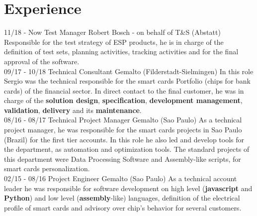 \documentclass[]{friggeri-cv}
\begin{document}

\section{Experience}
\begin{entrylist}
  \entry
    {11/18 - Now}
    {Test Manager}
    {\normalsize{Robert Bosch - on behalf of T\&S (Abstatt)}}
    {Responsible for the test strategy of ESP products, he is in charge of the definition of test sets, planning activities, tracking activities and for the final approval of the software.
    \\}
  \entry
    {09/17 - 10/18}
    {Technical Consultant}
    {\normalsize{Gemalto (Filderstadt-Sielmingen)}}
    {In this role Sergio was the technical responsible for the smart cards Portfolio (chips for bank cards) of the  financial sector. In direct contact to the final customer, he was in charge of the \textbf{solution design},\textbf{ specification},\textbf{ development management},\textbf{ validation},\textbf{ delivery} and its\textbf{ maintenance}.
     \\}
  \entry
    {08/16 - 08/17}
    {Technical Project Manager}
    {\normalsize{Gemalto (Sao Paulo)}}
    {As a technical project manager, he was responsible for the smart cards projects in Sao Paulo (Brazil) for the first tier accounts. In this role he also led and develop tools for the department, as automation and optimization tools. The standard projects of this department were Data Processing Software and Assembly-like scripts, for smart cards personalization. 
    \\}
    \entry
    {02/15 - 08/16}
    {Project Engineer}
    {\normalsize{Gemalto (Sao Paulo)}}
    {As a technical account leader he was responsible for software development on high level (\textbf{javascript} and \textbf{Python}) and low level (\textbf{assembly}-like) languages, definition of the electrical profile of smart cards and advisory over chip's behavior for several customers. \\}
    

\end{entrylist}
\end{document}
